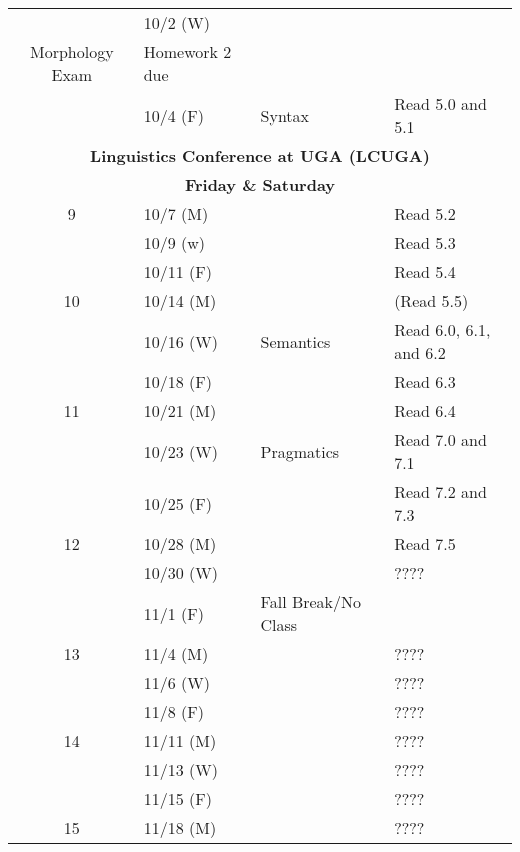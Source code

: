 \documentclass{article}
\makeatletter
\newcommand{\cellbreak}[2]{
    \begin{tabular}[t]{@{}l@{}}
      #1\\
      #2
    \end{tabular}}
\newcommand{\rowvspace}{\rule{0pt}{14pt}}
\makeatother
\begin{document}
\begin{longtable}{c l l l}
            & 10/2 (W)    & \cellbreak{Phonology \&}
                                      {Morphology Exam}     & Homework 2 due\\
            & 10/4 (F)    & Syntax                          & Read 5.0 and 5.1\\
      \multicolumn{4}{c}{\textbf{Linguistics Conference at UGA (LCUGA)}\rowvspace}\\
      \multicolumn{4}{c}{\textbf{Friday \& Saturday}}\\
      9     & 10/7 (M)    & \rowvspace                      & Read 5.2\\
            & 10/9 (w)    &                                 & Read 5.3\\
            & 10/11 (F)   &                                 & Read 5.4\\
      10    & 10/14 (M)   &                                 & (Read 5.5)\\
            & 10/16 (W)   & Semantics                       & Read 6.0, 6.1, and 6.2\\
            & 10/18 (F)   &                                 & Read 6.3\\
      11    & 10/21 (M)   &                                 & Read 6.4\\
            & 10/23 (W)   & Pragmatics                      & Read 7.0 and 7.1\\
            & 10/25 (F)   &                                 & Read 7.2 and 7.3\\
      12    & 10/28 (M)   &                                 & Read 7.5\\
            & 10/30 (W)   &                                 & ????\\
            & 11/1 (F)    & Fall Break/No Class             & \\
      13    & 11/4 (M)    &                                 & ????\\
            & 11/6 (W)    &                                 & ????\\
            & 11/8 (F)    &                                 & ????\\
      14    & 11/11 (M)   &                                 & ????\\
            & 11/13 (W)   &                                 & ????\\
            & 11/15 (F)   &                                 & ????\\
      15    & 11/18 (M)   &                                 & ????\\

\end{longtable}
\end{document}
